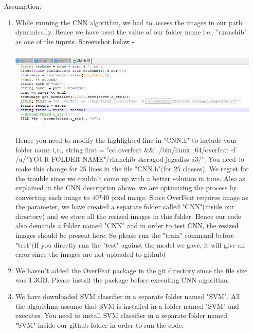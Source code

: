 \documentclass{article}
\begin{document}
Assumption:
\begin{enumerate}
	\item While running the CNN algorithm, we had to access the images in our path dynamically. Hence we have used the value of our folder name i.e., "rkanchib" as one of the inputs. Screenshot below - 
	\begin{center}
		\includegraphics[width=14cm, height=4cm]{assumption.png} \\
	\end{center}
	Hence you need to modify the highlighted line in "CNN.h" to include your folder name i,e., \newline \newline
	string first = "cd overfeat \&\& ./bin/linux\_64/overfeat -f /u/"YOUR FOLDER NAME"/rkanchib-skeragod-jagadiss-a3/"; \newline \newline
	You need to make this change for 25 lines in the file "CNN.h"(for 25 classes). We regret for the trouble since we couldn't come up with a better solution in time. \newline \newline
	Also as explained in the CNN description above, we are optimizing the process by converting each image to 40*40 pixel image. Since OverFeat requires image as the parameter, we have created a separate folder called "CNN"(inside our directory) and we store all the resized images in this folder. Hence our code also demands a folder named "CNN" and in order to test CNN, the resized images should be present here. \newline
	So please run the "train" command before "test"(If you directly run the "test" against the model we gave, it will give an error since the images are not uploaded to github) \newline
	
	\item We haven't added the OverFeat package in the git directory since the file size was 1.3GB. Please install the package before executing CNN algorithm. \newline
	
	\item We have downloaded SVM classifier in a separate folder named "SVM". All the algorithms assume that SVM is installed in a folder named "SVM" and executes. You need to install SVM classifier in a separate folder named "SVM" inside our github folder in order to run the code.
	
\end{enumerate}
\end{document}
